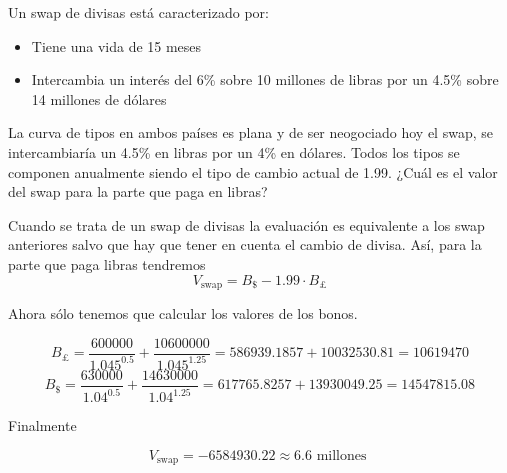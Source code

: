 \begin{problem}[4]
Un swap de divisas está caracterizado por:
\begin{itemize}
\item Tiene una vida de 15 meses
\item Intercambia un interés del 6\% sobre 10 millones de libras por un 4.5\% sobre 14 millones de dólares
\end{itemize}

La curva de tipos en ambos países es plana y de ser neogociado hoy el swap, se intercambiaría un 4.5\% en libras por un 4\% en dólares. Todos los tipos se componen anualmente siendo el tipo de cambio actual de 1.99. ¿Cuál es el valor del swap para la parte que paga en libras?

\solution
{}

Cuando se trata de un swap de divisas la evaluación es equivalente a los swap anteriores salvo que hay que tener en cuenta el cambio de divisa. Así, para la
parte que paga libras tendremos
\[V_{\text{swap}}=B_{\$}-1.99\cdot B_{\pounds}\]

Ahora sólo tenemos que calcular los valores de los bonos.

\[B_{\pounds} = \frac{600000}{1.045^{0.5}} + \frac{10600000}{1.045^{1.25}} = 586939.1857 + 10032530.81 = 10619470\]
\[B_{\$} = \frac{630000}{1.04^{0.5}} + \frac{14630000}{1.04^{1.25}} = 617765.8257 +13930049.25 = 14547815.08\]

Finalmente

\[V_{\text{swap}} = -6584930.22 \approx 6.6 \text{ millones }\]
\end{problem}

